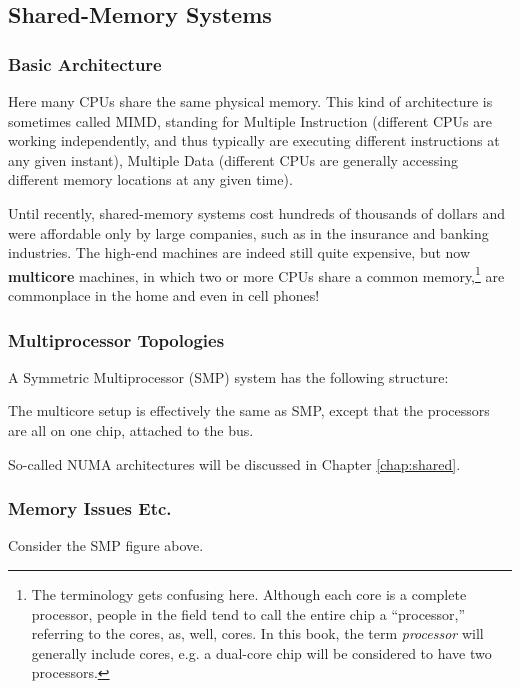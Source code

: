 \subsection{Shared-Memory Systems}

\subsubsection{Basic Architecture}

Here many CPUs share the same physical memory.  This kind of
architecture is sometimes called MIMD, standing for Multiple Instruction
(different CPUs are working independently, and thus typically are
executing different instructions at any given instant), Multiple Data
(different CPUs are generally accessing different memory locations at
any given time).

Until recently, shared-memory systems cost hundreds of thousands of
dollars and were affordable only by large companies, such as in the
insurance and banking industries.  The high-end machines are indeed
still quite expensive, but now {\bf multicore} machines, in which two or
more CPUs share a common memory,\footnote{The terminology gets confusing
here.  Although each core is a complete processor, people in the field
tend to call the entire chip a ``processor,'' referring to the cores,
as, well, cores.  In this book, the term {\it processor} will generally
include cores, e.g. a dual-core chip will be considered to have two
processors.} are commonplace in the home and even in cell phones!

\subsubsection{Multiprocessor Topologies}

A Symmetric Multiprocessor (SMP) system has the following structure:



The multicore setup is effectively the same as SMP, except that the
processors are all on one chip, attached to the bus.

So-called NUMA architectures will be discussed in Chapter
\ref{chap:shared}.

\subsubsection{Memory Issues Etc.}

Consider the SMP figure above.


